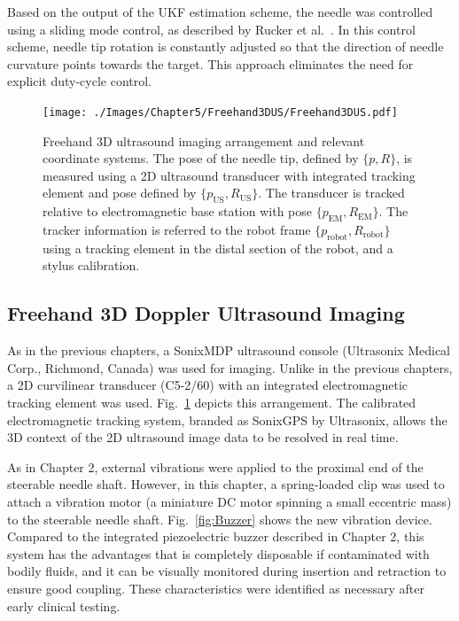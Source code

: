 Based on the output of the UKF estimation scheme, the needle was controlled using a sliding mode control, as described by Rucker et al.~\cite{Rucker2013}. In this control scheme, needle tip rotation is constantly adjusted so that the direction of needle curvature points towards the target. This approach eliminates the need for explicit duty-cycle control. 

\begin{figure}[!t]
\centering
\texttt{[image: ./Images/Chapter5/Freehand3DUS/Freehand3DUS.pdf]}%
\caption[Freehand 3D ultrasound imaging arrangement]{Freehand 3D ultrasound imaging arrangement and relevant coordinate systems. The pose of the needle tip, defined by $\{p,R\}$, is measured using a 2D ultrasound transducer with integrated tracking element and pose defined by $\{p_{\text{US}},R_{\text{US}}\}$. The transducer is tracked relative to electromagnetic base station with pose $\{p_{\text{EM}},R_{\text{EM}}\}$. The tracker information is referred to the robot frame $\{p_{\text{robot}},R_{\text{robot}}\}$ using a tracking element in the distal section of the robot, and a stylus calibration.}
\label{fig:freehand3DUS}
\end{figure}  

\subsection{Freehand 3D Doppler Ultrasound Imaging}
As in the previous chapters, a SonixMDP ultrasound console (Ultrasonix Medical Corp., Richmond, Canada) was used for imaging. Unlike in the previous chapters, a 2D curvilinear transducer (C5-2/60) with an integrated electromagnetic tracking element was used. Fig.~\ref{fig:freehand3DUS} depicts this arrangement. The calibrated electromagnetic tracking system, branded as SonixGPS by Ultrasonix, allows the 3D context of the 2D ultrasound image data to be resolved in real time. 

As in Chapter 2, external vibrations were applied to the proximal end of the steerable needle shaft. However, in this chapter, a spring-loaded clip was used to attach a vibration motor (a miniature DC motor spinning a small eccentric mass) to the steerable needle shaft. Fig.~\ref{fig:Buzzer} shows the new vibration device. Compared to the integrated piezoelectric buzzer described in Chapter 2, this system has the advantages that is completely disposable if contaminated with bodily fluids, and it can be visually monitored during insertion and retraction to ensure good coupling. These characteristics were identified as necessary after early clinical testing.


